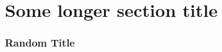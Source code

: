 


\begin{frame}
  \maketitle
\end{frame}

\section[Short]{Some longer section title}

\begin{frame}[c]\frametitle{Random Title}
    
\end{frame}

\beginbackup

\backupend

